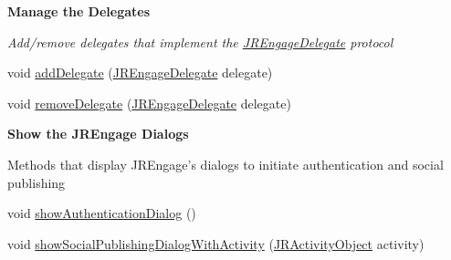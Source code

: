 \begin{Indent}{\bf Manage the Delegates}\par
{\em \label{_amgrpf6bb425cb9b7388d33e37d551db6b02e}
 Add/remove delegates that implement the \hyperlink{interfacecom_1_1janrain_1_1android_1_1engage_1_1_j_r_engage_delegate}{JREngageDelegate} protocol }\begin{DoxyCompactItemize}
\item 
void \hyperlink{classcom_1_1janrain_1_1android_1_1engage_1_1_j_r_engage_a7bbc6073780da1e97b3809d15a9394e1}{addDelegate} (\hyperlink{interfacecom_1_1janrain_1_1android_1_1engage_1_1_j_r_engage_delegate}{JREngageDelegate} delegate)
\item 
void \hyperlink{classcom_1_1janrain_1_1android_1_1engage_1_1_j_r_engage_adf46ec2da28c76195c2aa4eb8339d519}{removeDelegate} (\hyperlink{interfacecom_1_1janrain_1_1android_1_1engage_1_1_j_r_engage_delegate}{JREngageDelegate} delegate)
\end{DoxyCompactItemize}
\end{Indent}
\begin{Indent}{\bf Show the JREngage Dialogs}\par
{\em \label{_amgrp345603279e1df04f4a3678e78089b7be}
 \label{classcom_1_1janrain_1_1android_1_1engage_1_1_j_r_engage_showMethods}
\hypertarget{classcom_1_1janrain_1_1android_1_1engage_1_1_j_r_engage_showMethods}{}


Methods that display JREngage's dialogs to initiate authentication and social publishing }\begin{DoxyCompactItemize}
\item 
void \hyperlink{classcom_1_1janrain_1_1android_1_1engage_1_1_j_r_engage_a0de1aa16e951a1b62e2ef459b1596e83}{showAuthenticationDialog} ()
\item 
void \hyperlink{classcom_1_1janrain_1_1android_1_1engage_1_1_j_r_engage_a98d8f74d3bdf5a8cb9501be11be0d451}{showSocialPublishingDialogWithActivity} (\hyperlink{classcom_1_1janrain_1_1android_1_1engage_1_1types_1_1_j_r_activity_object}{JRActivityObject} activity)
\end{DoxyCompactItemize}
\end{Indent}


